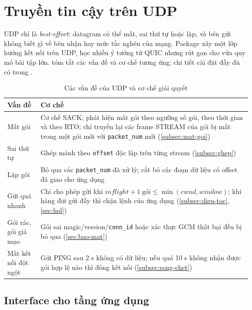 \section{Truyền tin cậy trên UDP}
\label{sec:tin-cay}

UDP chỉ là \emph{best-effort}: datagram có thể mất, sai thứ tự hoặc lặp, và bên gửi không biết gì về bên nhận
hay mức tắc nghẽn của mạng. Package  xây một lớp hướng kết nối trên UDP, học nhiều ý
tưởng từ QUIC \cite{rfc9000,rfc9002} nhưng rút gọn cho vừa quy mô bài tập lớn.  tóm tắt các
vấn đề và cơ chế tương ứng; chi tiết cài đặt đầy đủ có trong .

\begin{table}[H]
  \centering
  \caption{Các vấn đề của UDP và cơ chế giải quyết}
  \label{tab:van-de-udp}
  \begin{tabularx}{\linewidth}{lY}
    \toprule
    \textbf{Vấn đề} & \textbf{Cơ chế} \\
    \midrule
    Mất gói & Cơ chế SACK; phát hiện mất gói theo ngưỡng số gói, theo thời gian và theo RTO; chỉ truyền lại các
    frame STREAM của gói bị mất trong một gói mới với \texttt{packet\_num} mới (\cref{subsec:mat-goi}) \\
    Sai thứ tự & Ghép mảnh theo \texttt{offset} độc lập trên từng stream (\cref{subsec:ghep}) \\
    Lặp gói & Bỏ qua các \texttt{packet\_num} đã xử lý; cắt bỏ các đoạn dữ liệu có offset đã giao cho ứng dụng \\
    Gửi quá nhanh & Chỉ cho phép gửi khi $\mathit{inflight} + 1\ \text{gói} \le \min(\mathit{cwnd},
    \mathit{window})$; khi hàng đợi gửi đầy thì chặn lệnh  của ứng dụng (\cref{subsec:dieu-toc}, \cref{sec:hol}) \\
    Gói rác, gói giả mạo & Gói sai magic/version/\texttt{conn\_id} hoặc xác thực GCM thất bại đều bị bỏ qua
    (\cref{sec:bao-mat}) \\
    Mất kết nối đột ngột & Gửi PING sau 2 s không có dữ liệu; nếu quá 10 s không nhận được gói hợp lệ nào thì
    đóng kết nối (\cref{subsec:song-chet}) \\
    \bottomrule
  \end{tabularx}
\end{table}

\subsection{Interface cho tầng ứng dụng}
\label{sec:api}

